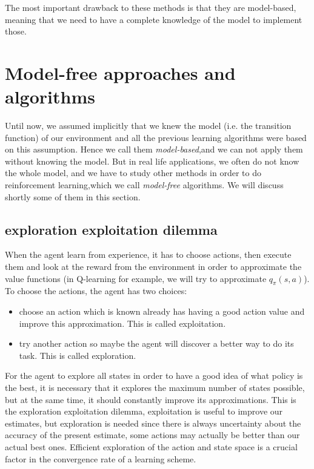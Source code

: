 \documentclass[14pt,a4paper]{article}
\theoremstyle{definition}
\begin{document}
The most important drawback to these methods is that they are model-based, meaning that we need to have a complete knowledge of the model to implement those.

\section{Model-free approaches and algorithms}

Until now, we assumed implicitly that we knew the model (i.e. the transition function) of our environment and all the previous learning algorithms were based on this assumption. Hence we call them \emph{model-based},and we can not apply them without knowing the model. But in real life applications, we often do not know the whole model, and we have to study other methods in order to do reinforcement learning,which we call \emph{model-free} algorithms. We will discuss shortly some of them in this section.


\subsection{exploration exploitation dilemma}

When the agent learn from experience, it has to choose actions, then execute them and look at the reward from the environment in order to approximate the value functions (in Q-learning for example, we will try to approximate $q_\pi(s,a)$). To choose the actions, the agent has two choices:
\begin{itemize}
\item choose an action which is known already has having a good action value and improve this approximation. This is called exploitation.
\item try another action so maybe the agent will discover a better way to do its task. This is called exploration. 
\end{itemize}

For the agent to explore all states in order to have a good idea of what policy is the best, it is necessary that it explores the maximum number of states possible, but at the same time, it should constantly improve its approximations. This is the exploration exploitation dilemma, exploitation is useful to improve our estimates, but exploration is needed since there is always uncertainty about the accuracy of the present estimate, some actions may actually be better than our actual best ones. Efficient exploration of the action and state space is a crucial factor in the convergence rate of a learning scheme.
\end{document}
